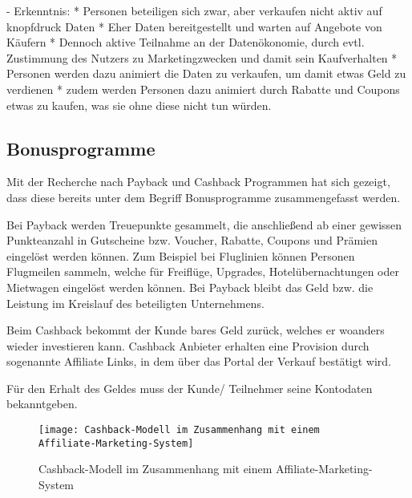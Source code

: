 - Erkenntnis:
    * Personen beteiligen sich zwar, aber verkaufen nicht aktiv auf knopfdruck Daten
    * Eher Daten bereitgestellt und warten auf Angebote von Käufern
    * Dennoch aktive Teilnahme an der Datenökonomie, durch evtl. Zustimmung des Nutzers zu Marketingzwecken und damit sein Kaufverhalten
    * Personen werden dazu animiert die Daten zu verkaufen, um damit etwas Geld zu verdienen
    * zudem werden Personen dazu animiert durch Rabatte und Coupons etwas zu kaufen, was sie ohne diese nicht tun würden.


    \subsection{Bonusprogramme}

    Mit der Recherche nach Payback und Cashback Programmen hat sich gezeigt, dass diese bereits unter dem Begriff Bonusprogramme zusammengefasst werden.\newline
    
    \noindent Bei Payback werden Treuepunkte gesammelt, die anschließend ab einer gewissen Punkteanzahl in Gutscheine bzw. Voucher, Rabatte, Coupons und Prämien eingelöst werden können. Zum Beispiel bei Fluglinien können Personen Flugmeilen sammeln, welche für Freiflüge, Upgrades, Hotelübernachtungen oder Mietwagen eingelöst werden können. Bei Payback bleibt das Geld bzw. die Leistung im Kreislauf des beteiligten Unternehmens. \cite{paycashback_all} \newline
     
    \noindent Beim Cashback bekommt der Kunde bares Geld zurück, welches er woanders wieder investieren kann. Cashback Anbieter erhalten eine Provision durch sogenannte Affiliate Links, in dem über das Portal der Verkauf bestätigt wird. \cite{cashback-vergleich} \newline
    
    \noindent Für den Erhalt des Geldes muss der Kunde/ Teilnehmer seine Kontodaten bekanntgeben. \cite{paycashback_all} \newline
        
    
    \begin{figure}[!ht]
        \centering
        \texttt{[image: Cashback-Modell im Zusammenhang mit einem Affiliate-Marketing-System]}
        \caption{Cashback-Modell im Zusammenhang mit einem Affiliate-Marketing-System \cite{Bonus_affiliate} }
        \label{fig:Bonus_affiliate}
    \end{figure}
    \FloatBarrier
    
